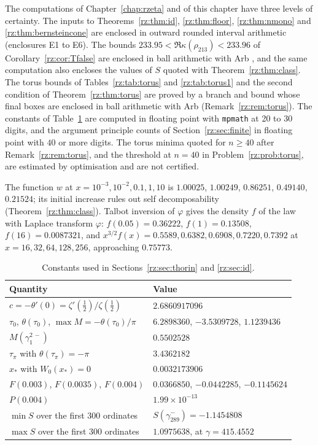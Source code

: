 The computations of Chapter~\ref{chap:rzeta} and of this chapter have three levels of certainty. The inputs to Theorems~\ref{rz:thm:id}, \ref{rz:thm:floor}, \ref{rz:thm:nmono} and \ref{rz:thm:bernsteincone} are enclosed in outward rounded interval arithmetic (enclosures E1 to E6). The bounds $233.95<\Re\kappa(\rho_{213})<233.96$ of Corollary~\ref{rz:cor:Tfalse} are enclosed in ball arithmetic with Arb \cite{Arb}, and the same computation also encloses the values of $S$ quoted with Theorem~\ref{rz:thm:class}. The torus bounds of Tables~\ref{rz:tab:torus} and \ref{rz:tab:torus1} and the second condition of Theorem~\ref{rz:thm:torus} are proved by a branch and bound whose final boxes are enclosed in ball arithmetic with Arb (Remark~\ref{rz:rem:torus}). The constants of Table~\ref{rz:tab:constants} are computed in floating point with \texttt{mpmath} at 20 to 30 digits, and the argument principle counts of Section~\ref{rz:sec:finite} in floating point with $40$ or more digits. The torus minima quoted for $n\ge40$ after Remark~\ref{rz:rem:torus}, and the threshold at $n=40$ in Problem~\ref{rz:prob:torus}, are estimated by optimisation and are not certified.

The function $w$ at $x=10^{-3},10^{-2},0.1,1,10$ is $1.00025$, $1.00249$, $0.86251$, $0.49140$, $0.21524$; its initial increase rules out self decomposability (Theorem~\ref{rz:thm:class}). Talbot inversion of $\varphi$ gives the density $f$ of the law with Laplace transform $\varphi$: $f(0.05)=0.36222$, $f(1)=0.13508$, $f(16)=0.0087321$, and $x^{3/2}f(x)=0.5589,0.6382,0.6908,0.7220,0.7392$ at $x=16,32,64,128,256$, approaching $0.75773$.

\begin{table}[htbp]
\centering
\begin{tabular}{ll}
\toprule
Quantity & Value\\
\midrule
$c=-\theta'(0)=\zeta'(\frac12)/\zeta(\frac12)$ & $2.6860917096$\\
$\tau_0$, $\theta(\tau_0)$, $\max M=-\theta(\tau_0)/\pi$ & $6.2898360$, $-3.5309728$, $1.1239436$\\
$M(\gamma_1^{2\,-})$ & $0.5502528$\\
$\tau_\pi$ with $\theta(\tau_\pi)=-\pi$ & $3.4362182$\\
$x_*$ with $W_0(x_*)=0$ & $0.0032173906$\\
$F(0.003)$, $F(0.0035)$, $F(0.004)$ & $0.0366850$, $-0.0442285$, $-0.1145624$\\
$P(0.004)$ & $1.99\times10^{-13}$\\
$\min S$ over the first 300 ordinates & $S(\gamma_{289}^-)=-1.1454808$\\
$\max S$ over the first 300 ordinates & $1.0975638$, at $\gamma=415.4552$\\
\bottomrule
\end{tabular}
\caption{Constants used in Sections~\ref{rz:sec:thorin} and \ref{rz:sec:id}.}
\label{rz:tab:constants}
\end{table}

